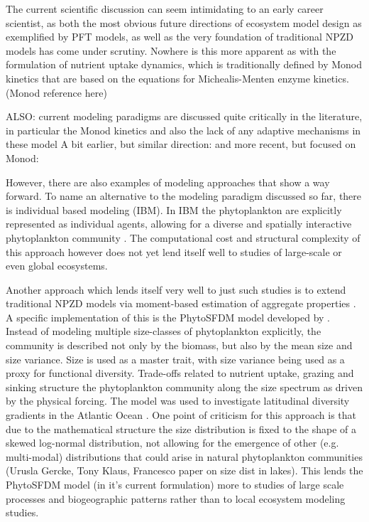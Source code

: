 The current scientific discussion can seem intimidating to an early career scientist, as both the most obvious future directions of ecosystem model design as exemplified by PFT models, as well as the very foundation of traditional NPZD models has come under scrutiny. Nowhere is this more apparent as with the formulation of nutrient uptake dynamics, which is traditionally defined by Monod kinetics that are based on the equations for Michealis-Menten enzyme kinetics. (Monod reference here)

ALSO: current modeling paradigms are discussed quite critically in the literature, in particular the Monod kinetics and also the lack of any adaptive mechanisms in these model \citep{Smith2014}
A bit earlier, but similar direction: \citep{Flynn2010}
and more recent, but focused on Monod: \citep{Hellweger2017a}

However, there are also examples of modeling approaches that show a way forward. To name an alternative to the modeling paradigm discussed so far, there is individual based modeling (IBM). In IBM the phytoplankton are explicitly represented as individual agents, allowing for a diverse and spatially interactive phytoplankton community \citep{Hellweger2009}. The computational cost and structural complexity of this approach however does not yet lend itself well to studies of large-scale or even global ecosystems. 

Another approach which lends itself very well to just such studies is to extend traditional NPZD models via moment-based estimation of aggregate properties \citep{Merico2009}. A specific implementation of this is the PhytoSFDM model developed by \citet{Acevedo-Trejos2016}. Instead of modeling multiple size-classes of phytoplankton explicitly, the community is described not only by the biomass, but also by the mean size and size variance. Size is used as a master trait, with size variance being used as a proxy for functional diversity. Trade-offs related to nutrient uptake, grazing and sinking structure the phytoplankton community along the size spectrum as driven by the physical forcing. The model was used to investigate latitudinal diversity gradients in the Atlantic Ocean \citep{Acevedo-Trejos2018}. One point of criticism for this approach is that due to the mathematical structure the size distribution is fixed to the shape of a skewed log-normal distribution, not allowing for the emergence of other (e.g. multi-modal) distributions that could arise in natural phytoplankton communities (Urusla Gercke, Tony Klaus, Francesco paper on size dist in lakes). This lends the PhytoSFDM model (in it's current formulation) more to studies of large scale processes and biogeographic patterns rather than to local ecosystem modeling studies.

